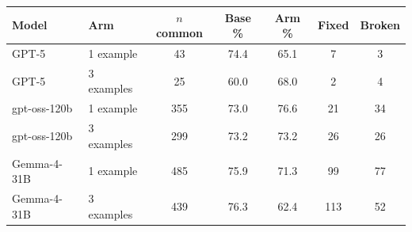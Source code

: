 \begin{tabular}{llccccc}
\toprule
Model & Arm & $n$ common & Base \% & Arm \% & Fixed & Broken \\
\midrule
GPT-5 & 1 example & 43 & 74.4 & 65.1 & 7 & 3 \\
GPT-5 & 3 examples & 25 & 60.0 & 68.0 & 2 & 4 \\
gpt-oss-120b & 1 example & 355 & 73.0 & 76.6 & 21 & 34 \\
gpt-oss-120b & 3 examples & 299 & 73.2 & 73.2 & 26 & 26 \\
Gemma-4-31B & 1 example & 485 & 75.9 & 71.3 & 99 & 77 \\
Gemma-4-31B & 3 examples & 439 & 76.3 & 62.4 & 113 & 52 \\
\bottomrule
\end{tabular}
